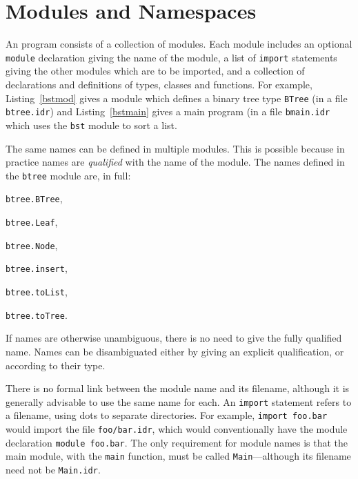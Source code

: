 \section{Modules and Namespaces}
\label{sect:namespaces}

An \Idris{} program consists of a collection of modules.
Each module includes an optional \texttt{module} declaration giving the name of the module, a list of \texttt{import} statements giving the other modules which are to be imported, and a collection of declarations and definitions of types, classes and functions.
For example, Listing~\ref{bstmod} gives a module which defines a binary tree type \texttt{BTree} (in a file \texttt{btree.idr}) and Listing~\ref{bstmain} gives a main program (in a file \texttt{bmain.idr} which uses the \texttt{bst} module to sort a list.



The same names can be defined in multiple modules.
This is possible because in practice names are \emph{qualified} with the name of the module. 
The names defined in the \texttt{btree} module are, in full:

\begin{multicols}{2}
\begin{compactitem}
\item \texttt{btree.BTree},
\item \texttt{btree.Leaf},
\item \texttt{btree.Node},
\columnbreak
\item \texttt{btree.insert},
\item \texttt{btree.toList},
\item \texttt{btree.toTree}.
\end{compactitem}
\end{multicols}

\noindent
If names are otherwise unambiguous, there is no need to give the fully qualified name.
Names can be disambiguated either by giving an explicit qualification, or according to their type.

There is no formal link between the module name and its filename, although it is generally advisable to use the same name for each.
An \texttt{import} statement refers to a filename, using dots to separate directories.
For example, \texttt{import foo.bar} would import the file \texttt{foo/bar.idr}, which would conventionally have the module declaration \texttt{module foo.bar}.
The only requirement for module names is that the main module, with the \texttt{main} function, must be called \texttt{Main}---although its filename need not be \texttt{Main.idr}.

